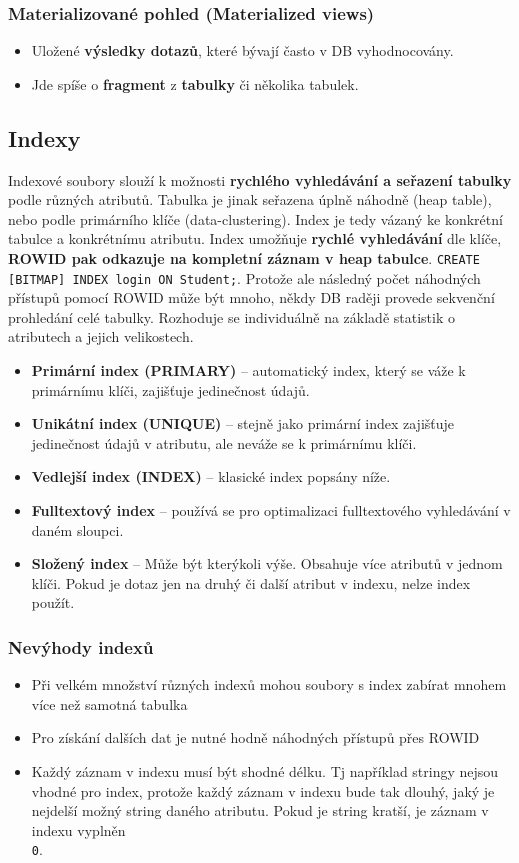 \subsubsection{Materializované pohled (Materialized views)}
\begin{itemize}
\item Uložené \textbf{výsledky dotazů}, které bývají často v DB vyhodnocovány.
\item Jde spíše o \textbf{fragment} z \textbf{tabulky} či několika tabulek.
\end{itemize}

\subsection{Indexy}
Indexové soubory slouží k možnosti \textbf{rychlého vyhledávání a seřazení tabulky} podle různých atributů. Tabulka je jinak seřazena úplně náhodně (heap table), nebo podle primárního klíče (data-clustering). Index je tedy vázaný ke konkrétní tabulce a konkrétnímu atributu. Index umožňuje \textbf{rychlé vyhledávání} dle klíče, \textbf{ROWID pak odkazuje na kompletní záznam v heap tabulce}. \texttt{CREATE [BITMAP] INDEX login ON Student;}. Protože ale následný počet náhodných přístupů pomocí ROWID může být mnoho, někdy DB raději provede sekvenční prohledání celé tabulky. Rozhoduje se individuálně na základě statistik o atributech a jejich velikostech.
\begin{itemize}
\item \textbf{Primární index (PRIMARY)} -- automatický index, který se váže k primárnímu klíči, zajišťuje jedinečnost údajů.
\item \textbf{Unikátní index (UNIQUE)} -- stejně jako primární index zajišťuje jedinečnost údajů v atributu, ale neváže se k primárnímu klíči.
\item \textbf{Vedlejší index (INDEX)} -- klasické index popsány níže.
\item \textbf{Fulltextový index} -- používá se pro optimalizaci fulltextového vyhledávání v daném sloupci.
\item \textbf{Složený index} -- Může být kterýkoli výše. Obsahuje více atributů v jednom klíči. Pokud je dotaz jen na druhý či další atribut v indexu, nelze index použít.
\end{itemize}

\subsubsection{Nevýhody indexů}
\begin{itemize}
	\item Při velkém množství různých indexů mohou soubory s index zabírat mnohem více než samotná tabulka
	\item Pro získání dalších dat je nutné hodně náhodných přístupů přes ROWID
	\item Každý záznam v indexu musí být shodné délku. Tj například stringy nejsou vhodné pro index, protože každý záznam v indexu bude tak dlouhý, jaký je nejdelší možný string daného atributu. Pokud je string kratší, je záznam v indexu vyplněn \texttt{\\0}.
\end{itemize}

